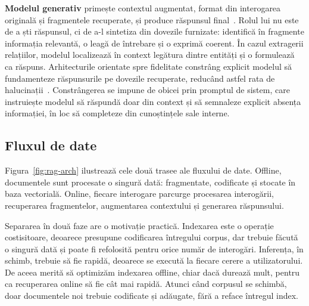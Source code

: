 \textbf{Modelul generativ} primește contextul augmentat, format din interogarea originală și fragmentele recuperate, și produce răspunsul final~\cite{lewis2020rag}. Rolul lui nu este de a ști răspunsul, ci de a-l sintetiza din dovezile furnizate: identifică în fragmente informația relevantă, o leagă de întrebare și o exprimă coerent. În cazul extragerii relațiilor, modelul localizează în context legătura dintre entități și o formulează ca răspuns. Arhitecturile orientate spre fidelitate constrâng explicit modelul să fundamenteze răspunsurile pe dovezile recuperate, reducând astfel rata de halucinații~\cite{asai2023self}. Constrângerea se impune de obicei prin promptul de sistem, care instruiește modelul să răspundă doar din context și să semnaleze explicit absența informației, în loc să completeze din cunoștințele sale interne.

\subsection{Fluxul de date}

Figura~\ref{fig:rag-arch} ilustrează cele două trasee ale fluxului de date. Offline, documentele sunt procesate o singură dată: fragmentate, codificate și stocate în baza vectorială. Online, fiecare interogare parcurge procesarea interogării, recuperarea fragmentelor, augmentarea contextului și generarea răspunsului.

Separarea în două faze are o motivație practică. Indexarea este o operație costisitoare, deoarece presupune codificarea întregului corpus, dar trebuie făcută o singură dată și poate fi refolosită pentru orice număr de interogări. Inferența, în schimb, trebuie să fie rapidă, deoarece se execută la fiecare cerere a utilizatorului. De aceea merită să optimizăm indexarea offline, chiar dacă durează mult, pentru ca recuperarea online să fie cât mai rapidă. Atunci când corpusul se schimbă, doar documentele noi trebuie codificate și adăugate, fără a reface întregul index.


